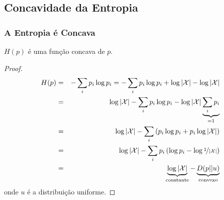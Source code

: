 \subsection{Concavidade da Entropia}
\begin{frame}[allowframebreaks]
  \frametitle{A Entropia é Concava}
  \begin{theorem}
  $H(p)$ é uma função concava de $p$.
  \end{theorem}

  \framebreak
  \begin{proof}
  \vspace{-4ex}
  \begin{eqnarray}
    H(p) &=& - \sum_i p_i \log p_i = - \sum_i p_i \log p_i  + \log \vert \mathcal{X} \vert - \log \vert \mathcal{X} \vert \nonumber \\
        &=& \log \vert \mathcal{X} \vert - \sum_i p_i \log p_i - \log \vert \mathcal{X} \vert \underbrace{\sum_i p_i}_{=1} \nonumber \\
        &=& \log \vert \mathcal{X} \vert - \sum_i \left( p_i \log p_i + p_i \log \vert \mathcal{X} \vert \right) \nonumber \\
        &=& \log \vert \mathcal{X} \vert - \sum_i p_i \left( \log p_i -  \log \nicefrac{1}{\vert \mathcal{X} \vert } \right) \nonumber \\
        &=& \underbrace{\log \vert \mathcal{X} \vert}_{\text{constante}} - \underbrace{D(p||u)}_{\text{convexo}}
  \end{eqnarray}
  onde $u$ é a distribuição uniforme.
  \end{proof}
\end{frame}

